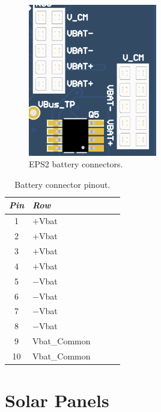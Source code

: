 \begin{figure}[!ht]
    \begin{center}
        \includegraphics[width=0.5\textwidth]{figures/battery-connector.png}
        \caption{EPS2 battery connectors.}
        \label{fig:battery-connector}
    \end{center}
\end{figure}

\begin{table}[!h]
    \centering
    \begin{tabular}{cllll}
        \toprule[1.5pt]
        \textit{Pin} & \textit{Row} \\
        \midrule
        1            & $+$Vbat \\
        2            & $+$Vbat \\
        3            & $+$Vbat \\
        4            & $+$Vbat \\
        5            & $-$Vbat \\
        6            & $-$Vbat \\
        7            & $-$Vbat \\
        8            & $-$Vbat \\
        9            & Vbat\_Common \\
        10           & Vbat\_Common \\
        \bottomrule[1.5pt]
    \end{tabular}
    \caption{Battery connector pinout.}
    \label{tab:battery-connector}
\end{table}

\section{Solar Panels}

